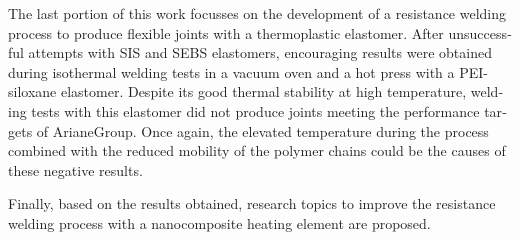 \begin{otherlanguage}{english}
	The last portion of this work focusses on the development of a resistance welding process to produce flexible joints with a thermoplastic elastomer. 
	After unsuccessful attempts with SIS and SEBS elastomers, encouraging results were obtained during isothermal welding tests in a vacuum oven and a hot press with a PEI-siloxane elastomer. 
	Despite its good thermal stability at high temperature, welding tests with this elastomer did not produce joints meeting the performance targets of ArianeGroup. 
	Once again, the elevated temperature during the process combined with the reduced mobility of the polymer chains could be the causes of these negative results. 
	
	Finally, based on the results obtained, research topics to improve the resistance welding process with a nanocomposite heating element are proposed. 
	
\end{otherlanguage}
